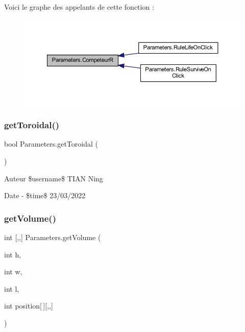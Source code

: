 Voici le graphe des appelants de cette fonction \+:
\nopagebreak
\begin{figure}[H]
\begin{center}
\leavevmode
\includegraphics[width=350pt]{class_parameters_a9eb50f6a67cb480f303e5d6f91997f7d_icgraph}
\end{center}
\end{figure}
\mbox{\label{class_parameters_aa6714e2b56d3511340476f682a51e677}} 
\subsubsection{\texorpdfstring{get\+Toroidal()}{getToroidal()}}
{\footnotesize\ttfamily bool Parameters.\+get\+Toroidal (\begin{DoxyParamCaption}{ }\end{DoxyParamCaption})\hspace{0.3cm}{\ttfamily [inline]}}

\begin{DoxyAuthor}{Auteur}
\$username\$ T\+I\+AN Ning 
\end{DoxyAuthor}
\begin{DoxyDate}{Date}
-\/ \$time\$ 23/03/2022 
\end{DoxyDate}
\mbox{\label{class_parameters_a5e16007361a29535bbad70f4f0a466bc}} 
\subsubsection{\texorpdfstring{get\+Volume()}{getVolume()}}
{\footnotesize\ttfamily int \mbox{[},,\mbox{]} Parameters.\+get\+Volume (\begin{DoxyParamCaption}\item[{int}]{h,  }\item[{int}]{w,  }\item[{int}]{l,  }\item[{int}]{position\mbox{[}$\,$\mbox{]}\mbox{[},,\mbox{]} }\end{DoxyParamCaption})\hspace{0.3cm}{\ttfamily [inline]}}

